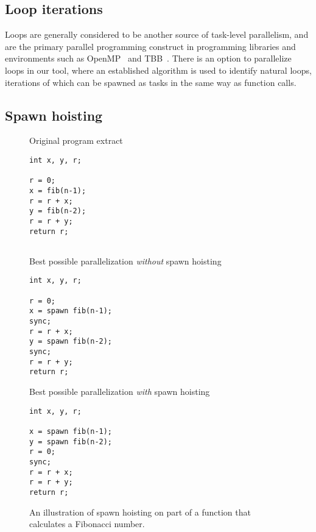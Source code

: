 \subsection{Loop iterations}
Loops are generally considered to be another source of task-level parallelism, and are the primary parallel programming construct in programming libraries and environments such as OpenMP~\cite{dagum98openmp} and TBB~\cite{reinders07intel}.
There is an option to parallelize loops in our tool, where an established algorithm \cite{aho86compilers,muchnick97advanced} is used to identify natural loops, iterations of which can be spawned as tasks in the same way as function calls.

\subsection{Spawn hoisting}

\begin{figure}
  \begin{center}
  \scriptsize
  \begin{SubFloat}{\label{spawn:orig}Original program extract}
    \begin{minipage}{0.7in}
      \begin{verbatim}
int x, y, r;

r = 0;
x = fib(n-1);
r = r + x;
y = fib(n-2);
r = r + y;
return r;


      \end{verbatim}
    \end{minipage}%
  \end{SubFloat}%
  \qquad
  \begin{SubFloat}{\label{spawn:without}Best possible parallelization \emph{without} spawn hoisting}
    \begin{minipage}{1.0in}
      \begin{verbatim}
int x, y, r;

r = 0;
x = spawn fib(n-1);
sync;
r = r + x;
y = spawn fib(n-2);
sync;
r = r + y;
return r;
      \end{verbatim}
    \end{minipage}%
  \end{SubFloat}%
  \qquad
  \begin{SubFloat}{\label{spawn:with}Best possible parallelization \emph{with} spawn hoisting}
    \begin{minipage}{1.0in}
      \begin{verbatim}
int x, y, r;

x = spawn fib(n-1);
y = spawn fib(n-2);
r = 0;
sync;
r = r + x;
r = r + y;
return r;

      \end{verbatim}
    \end{minipage}%
  \end{SubFloat}%
  \end{center}
  \caption{An illustration of spawn hoisting on part of a function that calculates a Fibonacci number.}
  \label{spawn}
\end{figure}

